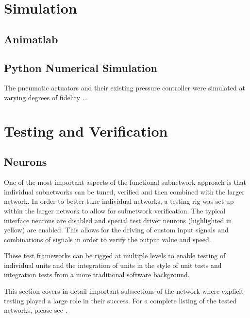 \section{Simulation}

\subsection{Animatlab}

\subsection{Python Numerical Simulation}

The pneumatic actuators and their existing pressure controller were simulated 
at varying degrees of fidelity ...


\section{Testing and Verification}

\subsection{Neurons}

One of the most important aspects of the functional subnetwork approach is that
individual subnetworks can be tuned, verified and then combined with the larger
network. In order to better tune individual networks, a testing rig was set up
within the larger network to allow for subnetwork verification. The typical
interface neurons are disabled and special test driver neurons (highlighted in
yellow) are enabled. This allows for the driving of custom input signals and
combinations of signals in order to verify the output value and speed.


These test frameworks can be rigged at multiple levels to enable testing of
individual units and the integration of units in the style of unit tests and
integration tests from a more traditional software background.



This section covers in detail important subsections of the network where
explicit testing played a large role in their success. For a complete listing of
the tested networks, please see .
